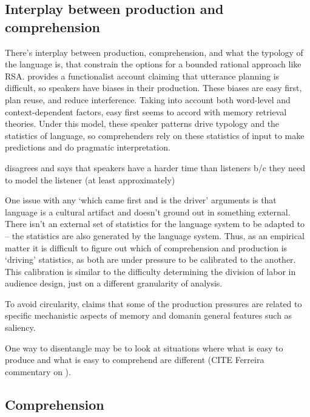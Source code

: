 \documentclass[]{article}
\begin{document}
\subsection{Interplay between production and comprehension}

There's interplay between production, comprehension, and what the typology of the language is, that constrain the options for a bounded rational approach like RSA. \cite{macdonald2013} provides a functionalist account claiming that utterance planning is difficult, so speakers have biases in their production. These biases are easy first, plan reuse, and reduce interference. Taking into account both word-level and context-dependent factors, easy first seems to accord with memory retrieval theories. %
Under this model, these speaker patterns drive typology and the statistics of language, so comprehenders rely on these statistics of input to make predictions and do pragmatic interpretation. 

\cite{heller2012} disagrees and says that speakers have a harder time than listeners b/c they need to model the listener (at least approximately) %

One issue with any `which came first and is the driver' arguments is that language is a cultural artifact and doesn't ground out in something external. There isn't an external set of statistics for the language system to be adapted to -- the statistics are also generated by the language system. Thus, as an empirical matter it is difficult to figure out which of comprehension and production is `driving' statistics, as both are under pressure to be calibrated to the another. This calibration is similar to the difficulty determining the division of labor in audience design, just on a different granularity of analysis. 

To avoid circularity, \cite{macdonald2013} claims that some of the production pressures are related to specific mechanistic aspects of memory and domanin general features such as saliency. %

One way to disentangle may be to look at situations where what is easy to produce and what is easy to comprehend are different (CITE Ferreira commentary on \cite{pickering2004}). 


\subsection{Comprehension}
\end{document}
